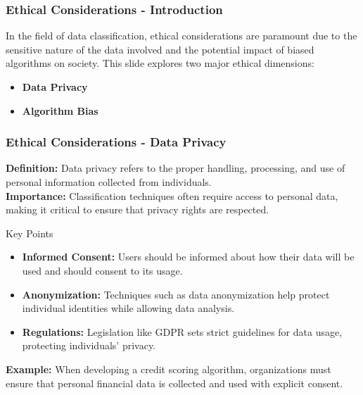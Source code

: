 \documentclass[aspectratio=169]{beamer}
\begin{document}
\begin{frame}[fragile]
    \frametitle{Ethical Considerations - Introduction}
    In the field of data classification, ethical considerations are paramount due to the sensitive nature of the data involved and the potential impact of biased algorithms on society. This slide explores two major ethical dimensions:
    \begin{itemize}
        \item \textbf{Data Privacy}
        \item \textbf{Algorithm Bias}
    \end{itemize}
\end{frame}

\begin{frame}[fragile]
    \frametitle{Ethical Considerations - Data Privacy}
    \textbf{Definition:} Data privacy refers to the proper handling, processing, and use of personal information collected from individuals.\\
    \textbf{Importance:} Classification techniques often require access to personal data, making it critical to ensure that privacy rights are respected.

    \begin{block}{Key Points}
        \begin{itemize}
            \item \textbf{Informed Consent:} Users should be informed about how their data will be used and should consent to its usage.
            \item \textbf{Anonymization:} Techniques such as data anonymization help protect individual identities while allowing data analysis.
            \item \textbf{Regulations:} Legislation like GDPR sets strict guidelines for data usage, protecting individuals' privacy.
        \end{itemize}
    \end{block}
    
    \textbf{Example:} When developing a credit scoring algorithm, organizations must ensure that personal financial data is collected and used with explicit consent.
\end{frame}
\end{document}
